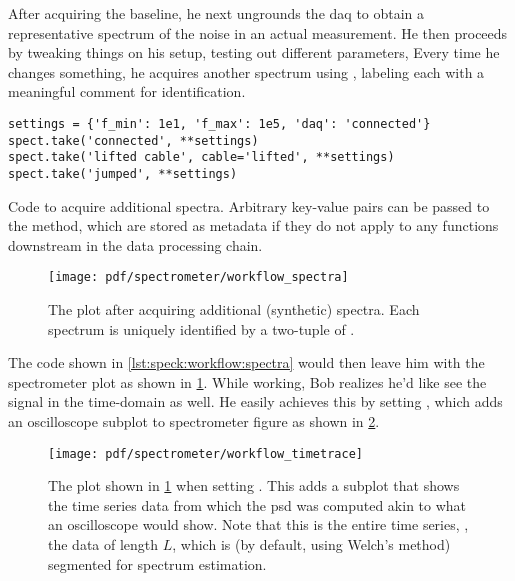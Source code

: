 After acquiring the baseline, he next ungrounds the \gls{daq} to obtain a representative spectrum of the noise in an actual measurement.
He then proceeds by tweaking things on his setup, testing out different parameters, \etc
Every time he changes something, he acquires another spectrum using , labeling each with a meaningful comment for identification.
\begin{listing}[H]
    \begin{verbatim}
settings = {'f_min': 1e1, 'f_max': 1e5, 'daq': 'connected'}
spect.take('connected', **settings)
spect.take('lifted cable', cable='lifted', **settings)
spect.take('jumped', **settings)
    \end{verbatim}
    \caption[]{
        Code to acquire additional spectra.
        Arbitrary key-value pairs can be passed to the  method, which are stored as metadata if they do not apply to any functions downstream in the data processing chain.
    }
    \label{lst:speck:workflow:spectra}
\end{listing}
\begin{figure}
    \centering
    \texttt{[image: pdf/spectrometer/workflow\_spectra]}
    \caption{
        The \pyspeck plot after acquiring additional (synthetic) spectra.
        Each spectrum is uniquely identified by a two-tuple of .
    }
    \label{fig:speck:software:workflow:spectra}
\end{figure}
The code shown in \cref{lst:speck:workflow:spectra} would then leave him with the spectrometer plot as shown in \cref{fig:speck:software:workflow:spectra}.
While working, Bob realizes he'd like see the signal in the time-domain as well.
He easily achieves this by setting , which adds an oscilloscope subplot to spectrometer figure as shown in \cref{fig:speck:software:workflow:timetrace}.

\begin{figure}
    \centering
    \texttt{[image: pdf/spectrometer/workflow\_timetrace]}
    \caption{
        The \pyspeck plot shown in \cref{fig:speck:software:workflow:spectra} when setting .
        This adds a subplot that shows the time series data from which the \gls{psd} was computed akin to what an oscilloscope would show.
        Note that this is the entire time series, \ie, the data of length $L$, which is (by default, using Welch's method) segmented for spectrum estimation.
    }
    \label{fig:speck:software:workflow:timetrace}
\end{figure}

